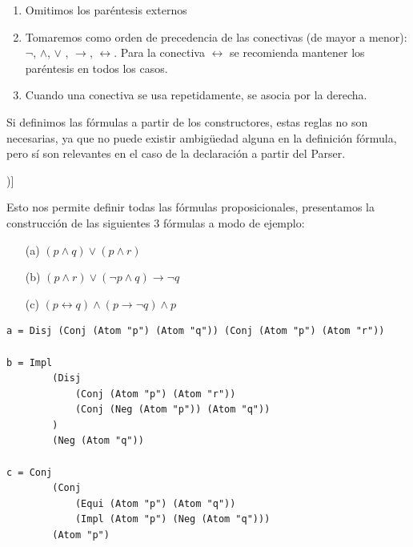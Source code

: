 \documentclass[a4paper]{report}
\begin{document}
\begin{enumerate}
\item Omitimos los paréntesis externos

\item Tomaremos como orden de precedencia de las conectivas (de mayor a menor): $\neg$, $\wedge$, $\vee$ , $\rightarrow$, $\leftrightarrow$. Para la conectiva $\leftrightarrow$ se recomienda mantener los paréntesis en todos los casos.

\item Cuando una conectiva se usa repetidamente, se asocia por la derecha.
\end{enumerate}

Si definimos las fórmulas a partir de los constructores, estas reglas no son necesarias, ya que no puede existir ambigüedad alguna en la definición fórmula, pero sí son relevantes en el caso de la declaración a partir del Parser.

\noindent [Ver la implementación del módulo \textit{LP\_Parser} para ver la implementación de dicho criterio. (\hyperref[sec:A1.LPParser]{\textit{\underline{Ver A1. LP\_Parser}}})]


Esto nos permite definir todas las fórmulas proposicionales, presentamos la construcción de las siguientes 3 fórmulas a modo de ejemplo:

\begin{multicols}{3}
\begin{itemize}
\item[(a)] $ (p \wedge q) \vee (p \wedge r)$
\item[(b)] $ (p \wedge r) \vee (\neg p \wedge q) \rightarrow \neg q$
\item[(c)] $(p \leftrightarrow q) \wedge (p \rightarrow \neg q) \wedge p$
\end{itemize}
\end{multicols}

\begin{lstlisting}[caption= Ejemplos de definición de fórmulas proposicionales.]
a = Disj (Conj (Atom "p") (Atom "q")) (Conj (Atom "p") (Atom "r"))
    
b = Impl 
        (Disj 
            (Conj (Atom "p") (Atom "r")) 
            (Conj (Neg (Atom "p")) (Atom "q"))
        ) 
        (Neg (Atom "q"))

c = Conj 
        (Conj 
            (Equi (Atom "p") (Atom "q")) 
            (Impl (Atom "p") (Neg (Atom "q"))) 
        (Atom "p")
\end{lstlisting}
\end{document}
